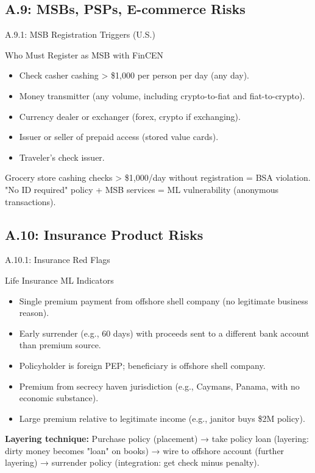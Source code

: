 \documentclass{beamer}
\begin{document}
	\subsection{A.9: MSBs, PSPs, E-commerce Risks}
	
	\begin{frame}{A.9.1: MSB Registration Triggers (U.S.)}
		\begin{block}{Who Must Register as MSB with FinCEN}
			\begin{itemize}
				\item Check casher cashing > \$1,000 per person per day (any day).
				\item Money transmitter (any volume, including crypto-to-fiat and fiat-to-crypto).
				\item Currency dealer or exchanger (forex, crypto if exchanging).
				\item Issuer or seller of prepaid access (stored value cards).
				\item Traveler's check issuer.
			\end{itemize}
		\end{block}
		\textcolor{red}{\textbf{}} Grocery store cashing checks > \$1,000/day without registration = BSA violation. "No ID required" policy + MSB services = ML vulnerability (anonymous transactions).
	\end{frame}
	
	\subsection{A.10: Insurance Product Risks}
	
	\begin{frame}{A.10.1: Insurance Red Flags}
		\begin{block}{Life Insurance ML Indicators}
			\begin{itemize}
				\item Single premium payment from offshore shell company (no legitimate business reason).
				\item Early surrender (e.g., 60 days) with proceeds sent to a different bank account than premium source.
				\item Policyholder is foreign PEP; beneficiary is offshore shell company.
				\item Premium from secrecy haven jurisdiction (e.g., Caymans, Panama, with no economic substance).
				\item Large premium relative to legitimate income (e.g., janitor buys \$2M policy).
			\end{itemize}
		\end{block}
		\textbf{Layering technique:} Purchase policy (placement) → take policy loan (layering: dirty money becomes "loan" on books) → wire to offshore account (further layering) → surrender policy (integration: get check minus penalty).
	\end{frame}
	
\end{document}
